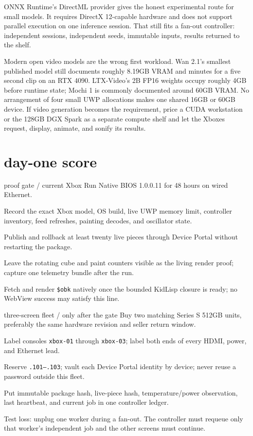 \documentclass[10pt,letterpaper]{article}
\begin{document}
ONNX Runtime's DirectML provider gives the honest experimental route for small
models. It requires DirectX 12-capable hardware and does not support parallel
execution on one inference session. That still fits a fan-out controller:
independent sessions, independent seeds, immutable inputs, results returned to
the shelf.

Modern open video models are the wrong first workload. Wan 2.1's smallest
published model still documents roughly 8.19GB VRAM and minutes for a five
second clip on an RTX 4090. LTX-Video's 2B FP16 weights occupy roughly 4GB
before runtime state; Mochi 1 is commonly documented around 60GB VRAM. No
arrangement of four small UWP allocations makes one shared 16GB or 60GB
device. If video generation becomes the requirement, price a CUDA workstation
or the 128GB DGX Spark as a separate compute shelf and let the Xboxes request,
display, animate, and sonify its results.

\section{day-one score}

\begin{gearcard}{proof gate / current Xbox}
\gearcheck Run Native BIOS 1.0.0.11 for 48 hours on wired Ethernet.\par
\gearcheck Record the exact Xbox model, OS build, live UWP memory limit,
controller inventory, feed refreshes, painting decodes, and oscillator state.\par
\gearcheck Publish and rollback at least twenty live pieces through Device
Portal without restarting the package.\par
\gearcheck Leave the rotating cube and paint counters visible as the living
render proof; capture one telemetry bundle after the run.\par
\gearcheck Fetch and render \texttt{\$obk} natively once the bounded KidLisp
closure is ready; no WebView success may satisfy this line.
\end{gearcard}

\begin{gearcard}{three-screen fleet / only after the gate}
\gearcheck Buy two matching Series S 512GB units, preferably the same hardware
revision and seller return window.\par
\gearcheck Label consoles \texttt{xbox-01} through \texttt{xbox-03}; label both
ends of every HDMI, power, and Ethernet lead.\par
\gearcheck Reserve \texttt{.101--.103}; vault each Device Portal identity by
device; never reuse a password outside this fleet.\par
\gearcheck Put immutable package hash, live-piece hash, temperature/power
observation, last heartbeat, and current job in one controller ledger.\par
\gearcheck Test loss: unplug one worker during a fan-out. The controller must
requeue only that worker's independent job and the other screens must continue.
\end{gearcard}
\end{document}
